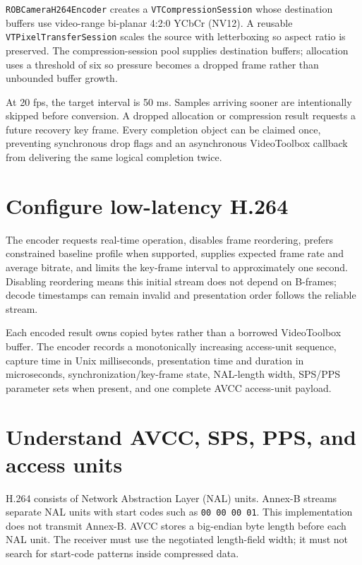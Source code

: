 \documentclass[10pt,openany]{book}
\begin{document}
\texttt{ROBCameraH264Encoder} creates a \texttt{VTCompressionSession} whose destination buffers use video-range bi-planar 4:2:0 YCbCr (NV12). A reusable \texttt{VTPixelTransferSession} scales the source with letterboxing so aspect ratio is preserved. The compression-session pool supplies destination buffers; allocation uses a threshold of six so pressure becomes a dropped frame rather than unbounded buffer growth.

At 20 fps, the target interval is 50 ms. Samples arriving sooner are intentionally skipped before conversion. A dropped allocation or compression result requests a future recovery key frame. Every completion object can be claimed once, preventing synchronous drop flags and an asynchronous VideoToolbox callback from delivering the same logical completion twice.

\section{Configure low-latency H.264}

The encoder requests real-time operation, disables frame reordering, prefers constrained baseline profile when supported, supplies expected frame rate and average bitrate, and limits the key-frame interval to approximately one second. Disabling reordering means this initial stream does not depend on B-frames; decode timestamps can remain invalid and presentation order follows the reliable stream.

Each encoded result owns copied bytes rather than a borrowed VideoToolbox buffer. The encoder records a monotonically increasing access-unit sequence, capture time in Unix milliseconds, presentation time and duration in microseconds, synchronization/key-frame state, NAL-length width, SPS/PPS parameter sets when present, and one complete AVCC access-unit payload.

\section{Understand AVCC, SPS, PPS, and access units}

H.264 consists of Network Abstraction Layer (NAL) units. Annex-B streams separate NAL units with start codes such as \texttt{00 00 00 01}. This implementation does not transmit Annex-B. AVCC stores a big-endian byte length before each NAL unit. The receiver must use the negotiated length-field width; it must not search for start-code patterns inside compressed data.
\end{document}
